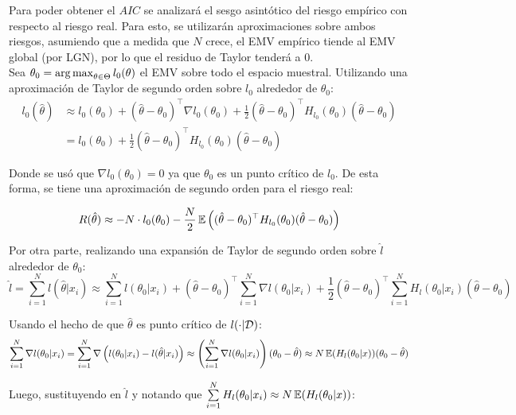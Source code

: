Para poder obtener el $AIC$ se analizará el sesgo asintótico del riesgo empírico con respecto al riesgo real. Para esto, se utilizarán aproximaciones sobre ambos riesgos, asumiendo que a medida que $N$ crece, el EMV empírico tiende al EMV global (por LGN), por lo que el residuo de Taylor tenderá a 0.\\

Sea $\theta_0 = \operatorname*{arg\,max}_{\theta\in\Theta} l_0(\theta)$ el EMV sobre todo el espacio muestral. Utilizando una aproximación de Taylor de segundo orden sobre $l_0$ alrededor de $\theta_0$:
\begin{align}
	l_0(\hat{\theta})&\approx l_0(\theta_0) + (\hat{\theta}-\theta_0)^\top \nabla l_0(\theta_0) + \frac{1}{2}(\hat{\theta}-\theta_0)^\top H_{l_0}(\theta_0) (\hat{\theta}-\theta_0)\\
	&= l_0(\theta_0) + \frac{1}{2}(\hat{\theta}-\theta_0)^\top H_{l_0}(\theta_0) (\hat{\theta}-\theta_0)
\end{align}

Donde se usó que $\nabla l_0(\theta_0)=0$ ya que $\theta_0$ es un punto crítico de $l_0$. De esta forma, se tiene una aproximación de segundo orden para el riesgo real:

\begin{equation*}
	R(\hat{\theta}) \approx -N \cdot l_0(\theta_0) - \frac{N}{2}\operatorname{\mathbb{E}}\left((\hat{\theta}-\theta_0)^\top H_{l_0}(\theta_0) (\hat{\theta}-\theta_0)\right)
\end{equation*}

Por otra parte, realizando una expansión de Taylor de segundo orden sobre $\hat{l}$ alrededor de $\theta_0$:
\begin{equation}
	\hat{l} = \sum_{i=1}^N l(\hat{\theta}|x_i) \approx \sum_{i=1}^N l(\theta_0|x_i) + (\hat{\theta}-\theta_0)^\top \sum_{i=1}^N \nabla l(\theta_0|x_i) + \frac{1}{2}(\hat{\theta}-\theta_0)^\top \sum_{i=1}^N H_l(\theta_0|x_i) (\hat{\theta}-\theta_0)
\end{equation}

Usando el hecho de que $\hat{\theta}$ es punto crítico de $l(\cdot|{\mathcal D})$:
\begin{equation}
	\sum_{i=1}^N \nabla l(\theta_0|x_i) = \sum_{i=1}^N \nabla \left(l(\theta_0|x_i) - l(\hat{\theta}|x_i)\right) \approx \left(\sum_{i=1}^N \nabla l(\theta_0|x_i)\right) (\theta_0-\hat{\theta}) \approx N \operatorname{\mathbb{E}}(H_l(\theta_0|x)) (\theta_0-\hat{\theta})
\end{equation}

Luego, sustituyendo en $\hat{l}$ y notando que $\sum\limits_{i=1}^N H_l(\theta_0|x_i) \approx N\operatorname{\mathbb{E}}(H_l(\theta_0|x))$:

